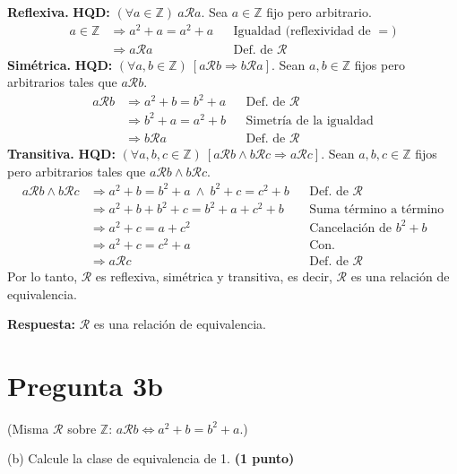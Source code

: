 \documentclass[11pt]{article}
\newcommand{\Rr}{\mathcal{R}}
\newcommand{\hl}[1]{\colorbox{green!35}{#1}}
\begin{document}
\textbf{Reflexiva.} \textbf{HQD:} $(\forall a\in\mathbb Z)\ a\Rr a$. Sea $a\in\mathbb Z$ fijo pero arbitrario.
\begin{align*}
a\in\mathbb Z &\Rightarrow a^2+a=a^2+a && \text{Igualdad (reflexividad de }=)\\
&\Rightarrow a\Rr a && \text{Def.\ de }\Rr
\end{align*}
\textbf{Simétrica.} \textbf{HQD:} $(\forall a,b\in\mathbb Z)\ [a\Rr b\Rightarrow b\Rr a]$. Sean $a,b\in\mathbb Z$ fijos pero arbitrarios tales que $a\Rr b$.
\begin{align*}
a\Rr b &\Rightarrow a^2+b=b^2+a && \text{Def.\ de }\Rr\\
&\Rightarrow b^2+a=a^2+b && \text{Simetría de la igualdad}\\
&\Rightarrow b\Rr a && \text{Def.\ de }\Rr
\end{align*}
\textbf{Transitiva.} \textbf{HQD:} $(\forall a,b,c\in\mathbb Z)\ [a\Rr b\wedge b\Rr c\Rightarrow a\Rr c]$. Sean $a,b,c\in\mathbb Z$ fijos pero arbitrarios tales que $a\Rr b\wedge b\Rr c$.
\begin{align*}
a\Rr b\wedge b\Rr c &\Rightarrow a^2+b=b^2+a\ \wedge\ b^2+c=c^2+b && \text{Def.\ de }\Rr\\
&\Rightarrow a^2+b+b^2+c=b^2+a+c^2+b && \text{Suma término a término}\\
&\Rightarrow a^2+c=a+c^2 && \text{Cancelación de }b^2+b\\
&\Rightarrow a^2+c=c^2+a && \text{Con.}\\
&\Rightarrow a\Rr c && \text{Def.\ de }\Rr
\end{align*}
Por lo tanto, $\Rr$ es reflexiva, simétrica y transitiva, es decir, $\Rr$ es una relación de equivalencia.

\textbf{Respuesta:} $\Rr$ es una relación de equivalencia.

\clearpage
\section*{Pregunta 3b}

(Misma $\Rr$ sobre $\mathbb Z$: $a\Rr b\iff a^2+b=b^2+a$.)

\hspace*{1.5em}(b) Calcule la \hl{clase de equivalencia de 1}. \hfill\textbf{(1 punto)}

\begin{center}
\end{center}
\end{document}
